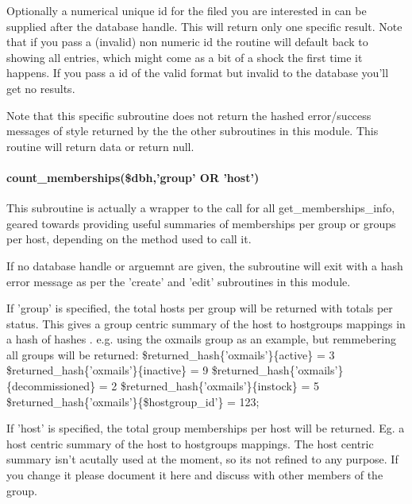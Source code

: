 \documentclass{book}
\begin{document}
Optionally a numerical unique id for the filed you are interested in can be supplied after the database handle. This will return only one specific result. Note that if you pass a (invalid) non numeric id the routine will default back to showing all entries, which might come as a bit of a shock the first time it happens. If you pass a id of the valid format but invalid to the database you'll get no results.



Note that this specific subroutine does not return the hashed error/success messages of style returned by the the other subroutines in this module. This routine will return data or return null.


\paragraph*{count\protect\_memberships(\$dbh,'group' OR 'host')}
\label{Inventory::Memberships_count_memberships_dbh_group_OR_host_}
\hypertarget{Inventory::Memberships_count_memberships_dbh_group_OR_host_}{}



This subroutine is actually a wrapper to the call for all get\_memberships\_info, geared towards providing useful summaries of memberships per group or groups per host, depending on the method used to call it.



If no database handle or arguemnt are given, the subroutine will exit with a hash error message as per the 'create' and 'edit' subroutines in this module.



If 'group' is specified, the total hosts per group will be returned with totals per status. This gives a group centric summary of the host to hostgroups mappings in a hash of hashes . e.g. using the oxmails group as an example, but remmebering all groups will be returned: \$returned\_hash\{'oxmails'\}\{active\} = 3 \$returned\_hash\{'oxmails'\}\{inactive\} = 9 \$returned\_hash\{'oxmails'\}\{decommissioned\} = 2 \$returned\_hash\{'oxmails'\}\{instock\} = 5 \$returned\_hash\{'oxmails'\}\{\$hostgroup\_id'\} = 123;



If 'host' is specified, the total group memberships per host will be returned. Eg. a host centric summary of the host to hostgroups mappings. The host centric summary isn't acutally used at the moment, so its not refined to any purpose. If you change it please document it here and discuss with other members of the group.
\end{document}
